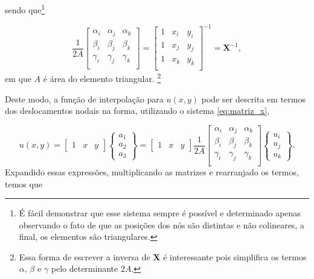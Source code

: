 sendo que\footnote{É fácil demonstrar que esse sistema sempre é possível e determinado apenas observando o fato de que as posições dos nós são distintas e não colineares, a final, os elementos são triangulares.}

\begin{equation}
    \frac{1}{2A}
    \begin{bmatrix}
        \alpha_i & \alpha_j & \alpha_k \\
        \beta_i & \beta_j & \beta_k \\
        \gamma_i & \gamma_j & \gamma_k \\
    \end{bmatrix} = 
    \begin{bmatrix}
        1 & x_i & y_i \\
        1 & x_j & y_j \\
        1 & x_k & y_k \\
    \end{bmatrix}^{-1} = \bm{X}^{-1},
\end{equation}
em que $A$ é área do elemento triangular. \footnote{Essa forma de escrever a inversa de $\bm{X}$ é interessante pois simplifica os termos $\alpha$, $\beta$ e $\gamma$ pelo determinante $2A$.}

Deste modo, a função de interpolação para $u(x,y)$ pode ser descrita em termos dos deslocamentos nodais na forma, utilizando o sistema \ref{eq:matriz_x},

\begin{equation}
    u(x,y) = \begin{bmatrix}
        1 & x & y
    \end{bmatrix} 
    \begin{Bmatrix}
        a_1 \\ a_2 \\ a_3
    \end{Bmatrix} = \begin{bmatrix}
        1 & x & y
    \end{bmatrix}  \frac{1}{2A}
    \begin{bmatrix}
        \alpha_i & \alpha_j & \alpha_k \\
        \beta_i & \beta_j & \beta_k \\
        \gamma_i & \gamma_j & \gamma_k \\
    \end{bmatrix}
    \begin{Bmatrix}
        u_i \\ u_j \\ u_k
    \end{Bmatrix}.
\end{equation}
Expandido essas expressões, multiplicando as matrizes e rearranjado os termos, temos que


